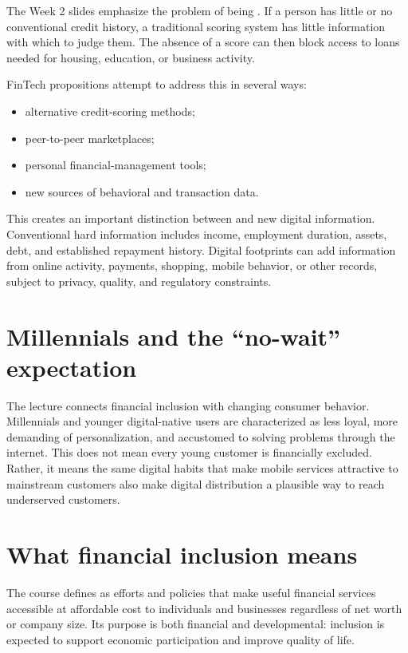 The Week 2 slides emphasize the problem of being . If a person has little or no conventional credit history, a traditional scoring system has little information with which to judge them. The absence of a score can then block access to loans needed for housing, education, or business activity.

FinTech propositions attempt to address this in several ways:

\begin{itemize}
  \item alternative credit-scoring methods;
  \item peer-to-peer marketplaces;
  \item personal financial-management tools;
  \item new sources of behavioral and transaction data.
\end{itemize}

This creates an important distinction between  and new digital information. Conventional hard information includes income, employment duration, assets, debt, and established repayment history. Digital footprints can add information from online activity, payments, shopping, mobile behavior, or other records, subject to privacy, quality, and regulatory constraints.

\section{Millennials and the ``no-wait'' expectation}

The lecture connects financial inclusion with changing consumer behavior. Millennials and younger digital-native users are characterized as less loyal, more demanding of personalization, and accustomed to solving problems through the internet. This does not mean every young customer is financially excluded. Rather, it means the same digital habits that make mobile services attractive to mainstream customers also make digital distribution a plausible way to reach underserved customers.

\section{What financial inclusion means}

The course defines  as efforts and policies that make useful financial services accessible at affordable cost to individuals and businesses regardless of net worth or company size. Its purpose is both financial and developmental: inclusion is expected to support economic participation and improve quality of life.

